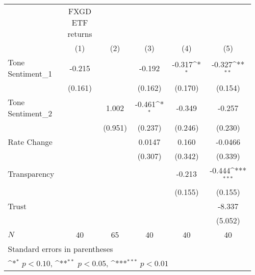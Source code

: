 {
\def\sym#1{\ifmmode^{#1}\else\(^{#1}\)\fi}
\begin{tabular}{l*{5}{c}}
\hline\hline
            &FXGD ETF returns         &                     &                     &                     &                     \\
            &\multicolumn{1}{c}{(1)}         &\multicolumn{1}{c}{(2)}         &\multicolumn{1}{c}{(3)}         &\multicolumn{1}{c}{(4)}         &\multicolumn{1}{c}{(5)}         \\
\hline
Tone Sentiment\_{1}&      -0.215         &                     &      -0.192         &      -0.317\sym{*}  &      -0.327\sym{**} \\
            &     (0.161)         &                     &     (0.162)         &     (0.170)         &     (0.154)         \\
[1em]
Tone Sentiment\_{2}&                     &       1.002         &      -0.461\sym{*}  &      -0.349         &      -0.257         \\
            &                     &     (0.951)         &     (0.237)         &     (0.246)         &     (0.230)         \\
[1em]
Rate Change &                     &                     &      0.0147         &       0.160         &     -0.0466         \\
            &                     &                     &     (0.307)         &     (0.342)         &     (0.339)         \\
[1em]
Transparency&                     &                     &                     &      -0.213         &      -0.444\sym{***}\\
            &                     &                     &                     &     (0.155)         &     (0.155)         \\
[1em]
Trust       &                     &                     &                     &                     &      -8.337         \\
            &                     &                     &                     &                     &     (5.052)         \\
\hline
\(N\)       &          40         &          65         &          40         &          40         &          40         \\
\hline\hline
\multicolumn{6}{l}{\footnotesize Standard errors in parentheses}\\
\multicolumn{6}{l}{\footnotesize \sym{*} \(p<0.10\), \sym{**} \(p<0.05\), \sym{***} \(p<0.01\)}\\
\end{tabular}
}
